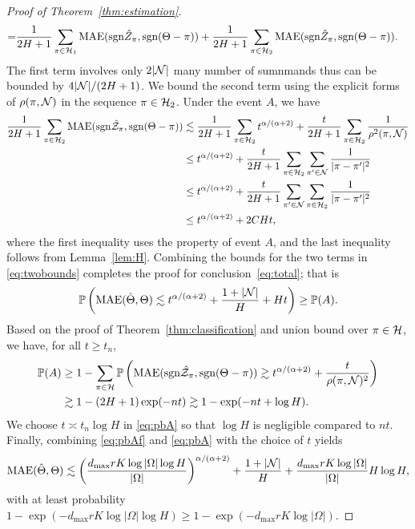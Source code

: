 \documentclass[twoside,11pt]{article}
\theoremstyle{plain}
\theoremstyle{definition}
\def\sign{\textup{sgn}}
\begin{document}
\begin{proof}[Proof of Theorem~\ref{thm:estimation}]
\begin{align}
=&{1\over 2H+1}\sum_{\pi \in\tH_1} \textup{MAE}(\sign \hat Z_\pi, \sign (\Theta-\pi))+{1\over 2H+1}\sum_{\pi \in  \tH_2} \textup{MAE}(\sign \hat Z_\pi, \sign (\Theta-\pi)).
\end{align}
The first term involves only $2|\mathcal{N}|$ many number of sumnmands thus can be bounded by $4|\mathcal{N}|/(2H+1)$.
 We bound the second term using the explicit forms of $\rho(\pi, \mathcal{N})$ in the sequence $\pi \in\mathcal{H}_2$. Under the event $A$, we have  
\begin{align}
{1\over 2H+1}\sum_{\pi \in \tH_2} \textup{MAE}(\sign \hat \tZ_\pi, \sign (\Theta-\pi)) &\lesssim  {1\over 2H+1}\sum_{\pi\in \tH_2} t^{\alpha/(\alpha+2)}+{t\over 2H+1}\sum_{\pi \in \tH_2}{1\over \rho^2(\pi, \tN)}\\
&\leq t^{\alpha/(\alpha+2)}+{t\over 2H+1} \sum_{\pi \in\tH_2} \sum_{\pi' \in \tN}{1\over |\pi-\pi'|^2}\\
&\leq  t^{\alpha/(\alpha+2)}+{t\over 2H+1} \sum_{\pi'\in \tN} \sum_{\pi \in \tH_2}{1\over |\pi-\pi'|^2}\\
&\leq t^{\alpha/(\alpha+2)}+ 2CHt,
\end{align}
where the first inequality uses the property of event $A$, and  the last inequality follows from Lemma~\ref{lem:H}.  Combining the bounds for the two terms in \eqref{eq:twobounds} completes the proof for conclusion~\eqref{eq:total}; that is 
\begin{align}\label{eq:pbAf}
\mathbb{P	}\left(\text{MAE}(\hat\Theta,\Theta)\lesssim t^{\alpha/(\alpha+2)}+\frac{1+|\mathcal{N}|}{H}+Ht\right)\geq \mathbb{P}(A).
\end{align} 
Based on the proof of Theorem~\ref{thm:classification} and union bound over $\pi\in\mathcal{H}$, we have, for all $t\geq t_n$,
\begin{align}\label{eq:pbA}
\mathbb{P}(A)&\geq 1-\sum_{\pi\in\tH} \mathbb{P}\left(\text{MAE}(\sign\hat \tZ_\pi,\sign(\Theta-\pi))\gtrsim t^{\alpha/(\alpha+2)}+\frac{t}{\rho(\pi,\tN)^2}\right)\nonumber\\
&\gtrsim 1-(2H+1)\exp(-nt)\gtrsim 1-\exp(-nt+\log H).
\end{align}
We choose $t\asymp t_n\log H$ in \eqref{eq:pbA} so that $\log H$ is negligible compared to $nt$.
Finally, combining \eqref{eq:pbAf} and \eqref{eq:pbA} with the choice of $t$  yields
\begin{align}
\text{MAE}(\hat\Theta,\Theta)\lesssim \left(d_{\max}rK\log |\Omega|\log H\over |\Omega|\right)^{\alpha/(\alpha+2)}+\frac{1+|\mathcal{N}|}{H}+{d_{\max}rK\log |\Omega|\over |\Omega|}H\log H,
 \end{align}
 with at least probability $1-\exp(-d_{\max}rK\log|\Omega|\log H)\geq 1-\exp(-d_{\max}rK\log|\Omega|)$.

\end{proof}
\end{document}
